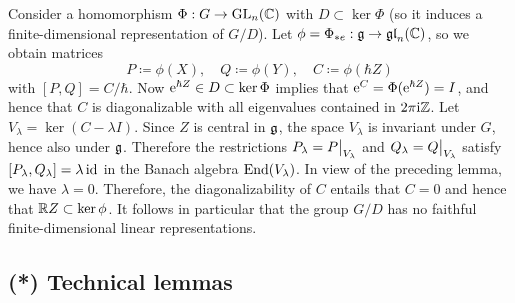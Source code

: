 \begin{example}
    Consider a homomorphism $\Phi:G\to\operatorname{GL}_n(\mathbb{C})$ with $D\subset \ker\Phi$ (so it induces a finite-dimensional representation of $G\slash D$). Let $\phi=\Phi_{\ast e}:\mathfrak{g}\to \mathfrak{gl}_n(\mathbb{C})$, so we obtain matrices
    \[P\coloneqq \phi(X), \quad Q\coloneqq \phi(Y),\quad C\coloneqq \phi(\hbar Z)\]
    with $[P,Q]=C/\hbar$. Now $\mathrm{e}^{\hbar Z}\in D\subset\ker\Phi$ implies that $\mathrm{e}^{C}=\Phi(\mathrm{e}^{\hbar Z})=I$, and hence that $C$ is diagonalizable with all eigenvalues contained in $2\pi\mathrm{i}\mathbb{Z}$. Let $V_\lambda=\ker (C-\lambda I)$. Since $Z$ is central in $\mathfrak{g}$, the space $V_\lambda$ is invariant under $G$, hence also under $\mathfrak{g}$. Therefore the restrictions $P_\lambda=\restr{P}{V_\lambda}$ and $Q_\lambda=\restr{Q}{V_\lambda}$ satisfy $[P_\lambda,Q_\lambda]=\lambda \operatorname{id}$ in the Banach algebra $\operatorname{End}(V_\lambda)$. In view of the preceding lemma, we have $\lambda=0$. Therefore, the diagonalizability of $C$ entails that $C=0$ and hence that $\mathbb{R} Z\subset \ker\phi$. It follows in particular that the group $G\slash D$ has no faithful finite-dimensional linear representations.
\end{example}









\subsection{(*) Technical lemmas}


